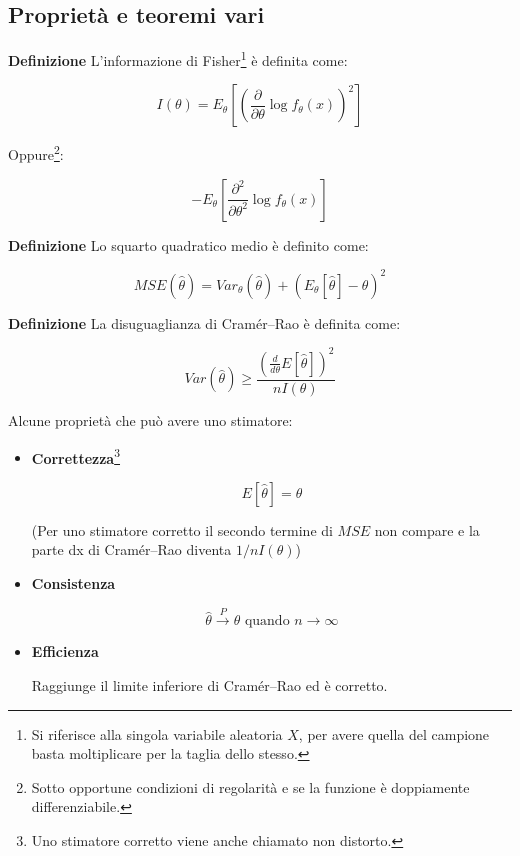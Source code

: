 \documentclass{article}
\newcommand{\df}{\noindent\textbf{Definizione} }
\begin{document}
\subsection{Proprietà e teoremi vari}

\df L'informazione di Fisher\footnote{Si riferisce alla singola variabile aleatoria $X$, per avere quella del campione basta moltiplicare per la taglia dello stesso.} è definita come:

$$I(\theta)=E_\theta\left[\left(\frac{\partial}{\partial\theta}\log f_\theta(x)\right)^2\right]$$

Oppure\footnote{Sotto opportune condizioni di regolarità e se la funzione è doppiamente differenziabile.}:

$$-E_\theta\left[\frac{\partial^2}{\partial\theta^2}\log f_\theta(x)\right]$$\newline

\df Lo squarto quadratico medio è definito come:

$$MSE(\hat{\theta})=Var_\theta(\hat{\theta})+(E_\theta[\hat{\theta}]-\theta)^2$$\newline

\df La disuguaglianza di Cramér–Rao è definita come:

$$Var(\hat{\theta})\geq\frac{\left(\frac{d}{d\theta}E[\hat{\theta}]\right)^2}{nI(\theta)}$$

\vspace{10pt}

Alcune proprietà che può avere uno stimatore:
\begin{itemize}
    \item \textbf{Correttezza}\footnote{Uno stimatore corretto viene anche chiamato non distorto.}

        $$E[\hat{\theta}]=\theta$$

        (Per uno stimatore corretto il secondo termine di $MSE$ non compare e la parte dx di Cramér–Rao diventa $1/nI(\theta)$)
    
    \item \textbf{Consistenza}

        $$\hat{\theta}\overset{P}{\rightarrow}\theta \text{ quando } n \rightarrow\infty$$
    
    \item \textbf{Efficienza}

        Raggiunge il limite inferiore di Cramér–Rao ed è corretto.\newline
    
\end{itemize}
\end{document}
